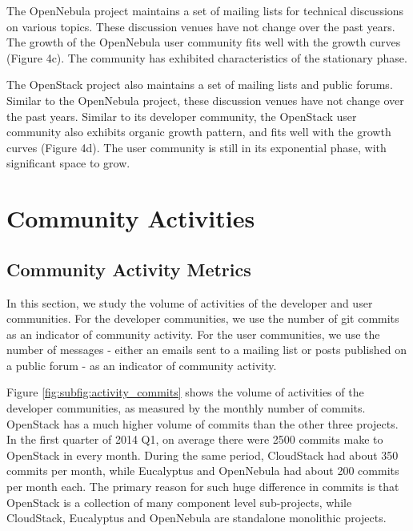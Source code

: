 \documentclass[conference]{IEEEtran}
\begin{document}
The OpenNebula project maintains a set of mailing lists for technical discussions on various topics. These discussion venues have not change over the past years. The growth of the OpenNebula user community fits well with the growth curves (Figure 4c). The community has exhibited characteristics of the stationary phase. 

The OpenStack project also maintains a set of mailing lists and public forums. Similar to the OpenNebula project, these discussion venues have not change over the past years. Similar to its developer community, the OpenStack user community also exhibits organic growth pattern, and fits well with the growth curves (Figure 4d). The user community is still in its exponential phase, with significant space to grow.


\section{Community Activities}
\label{sec:activity}

\subsection{Community Activity Metrics}

In this section, we study the volume of activities of the developer and user communities. For the developer communities, we use the number of git commits as an indicator of community activity. For the user communities, we use the number of messages - either an emails sent to a mailing list or posts published on a public forum - as an indicator of community activity. 

Figure \ref{fig:subfig:activity_commits} shows the volume of activities of the developer communities, as measured by the monthly number of commits. OpenStack has a much higher volume of commits than the other three projects. In the first quarter of 2014 Q1, on average there were 2500 commits make to OpenStack in every month. During the same period, CloudStack had about 350 commits per month, while Eucalyptus and OpenNebula had about 200 commits per month each. The primary reason for such huge difference in commits is that OpenStack is a collection of many component level sub-projects, while CloudStack, Eucalyptus and OpenNebula are standalone monolithic projects.    
\end{document}

